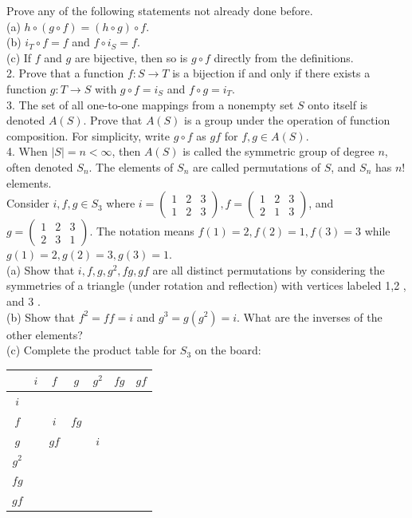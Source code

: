 Prove any of the following statements not already done before.\\
(a) $h \circ(g \circ f)=(h \circ g) \circ f$.\\
(b) $i_{T} \circ f=f$ and $f \circ i_{S}=f$.\\
(c) If $f$ and $g$ are bijective, then so is $g \circ f$ directly from the definitions.\\
2. Prove that a function $f: S \rightarrow T$ is a bijection if and only if there exists a function $g: T \rightarrow S$ with $g \circ f=i_{S}$ and $f \circ g=i_{T}$.\\
3. The set of all one-to-one mappings from a nonempty set $S$ onto itself is denoted $A(S)$. Prove that $A(S)$ is a group under the operation of function composition. For simplicity, write $g \circ f$ as $g f$ for $f, g \in A(S)$.\\
4. When $|S|=n<\infty$, then $A(S)$ is called the symmetric group of degree $n$, often denoted $S_{n}$. The elements of $S_{n}$ are called permutations of $S$, and $S_{n}$ has $n!$ elements.\\
Consider $i, f, g \in S_{3}$ where $i=\left(\begin{array}{lll}1 & 2 & 3 \\ 1 & 2 & 3\end{array}\right), f=\left(\begin{array}{lll}1 & 2 & 3 \\ 2 & 1 & 3\end{array}\right)$, and $g=\left(\begin{array}{lll}1 & 2 & 3 \\ 2 & 3 & 1\end{array}\right)$. The notation means $f(1)=2, f(2)=1, f(3)=3$ while $g(1)=2, g(2)=3, g(3)=1$.\\
(a) Show that $i, f, g, g^{2}, f g, g f$ are all distinct permutations by considering the symmetries of a triangle (under rotation and reflection) with vertices labeled 1,2 , and 3 .\\
(b) Show that $f^{2}=f f=i$ and $g^{3}=g\left(g^{2}\right)=i$. What are the inverses of the other elements?\\
(c) Complete the product table for $S_{3}$ on the board:

\begin{center}
\begin{tabular}{|c|c|c|c|c|c|c|}
\hline
 & $i$ & $f$ & $g$ & $g^{2}$ & $f g$ & $g f$ \\
\hline
$i$ &  &  &  &  &  &  \\
\hline
$f$ &  & $i$ & $f g$ &  &  &  \\
\hline
$g$ &  & $g f$ &  & $i$ &  &  \\
\hline
$g^{2}$ &  &  &  &  &  &  \\
\hline
$f g$ &  &  &  &  &  &  \\
\hline
$g f$ &  &  &  &  &  &  \\
\hline
\end{tabular}
\end{center}

